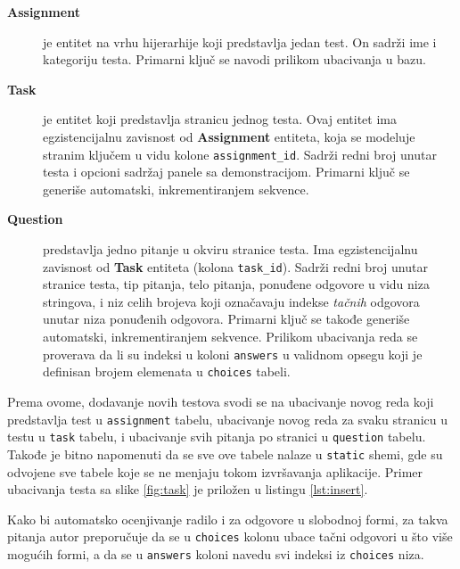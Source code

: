 \begin{description}
\item [\textbf{Assignment}] je entitet na vrhu hijerarhije koji predstavlja jedan test. On sadrži ime i kategoriju testa. Primarni ključ se navodi prilikom ubacivanja u bazu.
\item [\textbf{Task}] je entitet koji predstavlja stranicu jednog testa. Ovaj entitet ima egzistencijalnu zavisnost od \textbf{Assignment} entiteta, koja se modeluje stranim ključem u vidu kolone \texttt{assignment\_id}. Sadrži redni broj unutar testa i opcioni sadržaj panele sa demonstracijom. Primarni ključ se generiše automatski, inkrementiranjem sekvence.
\item [\textbf{Question}] predstavlja jedno pitanje u okviru stranice testa. Ima egzistencijalnu zavisnost od \textbf{Task} entiteta (kolona \texttt{task\_id}). Sadrži redni broj unutar stranice testa, tip pitanja, telo pitanja, ponuđene odgovore u vidu niza stringova, i niz celih brojeva koji označavaju indekse \emph{tačnih} odgovora unutar niza ponuđenih odgovora. Primarni ključ se takođe generiše automatski, inkrementiranjem sekvence. Prilikom ubacivanja reda se proverava da li su indeksi u koloni \texttt{answers} u validnom opsegu koji je definisan brojem elemenata u \texttt{choices} tabeli.
\end{description}

Prema ovome, dodavanje novih testova svodi se na ubacivanje novog reda koji predstavlja test u \texttt{assignment} tabelu, ubacivanje novog reda za svaku stranicu u testu u \texttt{task} tabelu, i ubacivanje svih pitanja po stranici u \texttt{question} tabelu. Takođe je bitno napomenuti da se sve ove tabele nalaze u \texttt{static} shemi, gde su odvojene sve tabele koje se ne menjaju tokom izvršavanja aplikacije. Primer ubacivanja testa sa slike \ref{fig:task} je priložen u listingu \ref{lst:insert}.


Kako bi automatsko ocenjivanje radilo i za odgovore u slobodnoj formi, za takva pitanja autor preporučuje da se u \texttt{choices} kolonu ubace tačni odgovori u što više mogućih formi, a da se u \texttt{answers} koloni navedu svi indeksi iz \texttt{choices} niza.